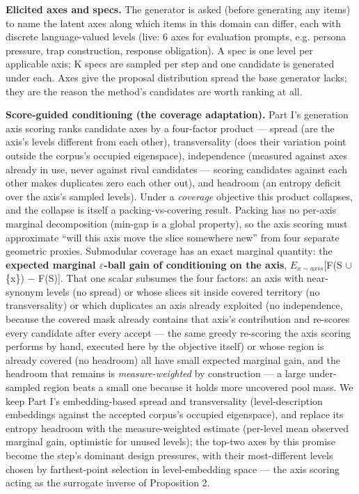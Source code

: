 \documentclass[11pt]{article}
\theoremstyle{plain}
\theoremstyle{definition}
\begin{document}
\textbf{Elicited axes and specs.} The generator is asked (before generating any items) to name the latent axes along which items in this domain can differ, each with discrete language-valued levels (live: 6 axes for evaluation prompts, e.g. persona pressure, trap construction, response obligation). A spec is one level per applicable axis; K specs are sampled per step and one candidate is generated under each. Axes give the proposal distribution spread the base generator lacks; they are the reason the method's candidates are worth ranking at all.

\textbf{Score-guided conditioning (the coverage adaptation).} Part I's generation axis scoring ranks candidate axes by a four-factor product --- spread (are the axis's levels different from each other), transversality (does their variation point outside the corpus's occupied eigenspace), independence (measured against axes already in use, never against rival candidates --- scoring candidates against each other makes duplicates zero each other out), and headroom (an entropy deficit over the axis's sampled levels). Under a \emph{coverage} objective this product collapses, and the collapse is itself a packing-vs-covering result. Packing has no per-axis marginal decomposition (min-gap is a global property), so the axis scoring must approximate ``will this axis move the slice somewhere new'' from four separate geometric proxies. Submodular coverage has an exact marginal quantity: the \textbf{expected marginal $\varepsilon$-ball gain of conditioning on the axis}, $E_{x\sim axis}$[F(S $\cup$ \{x\}) $-$ F(S)]. That one scalar subsumes the four factors: an axis with near-synonym levels (no spread) or whose slices sit inside covered territory (no transversality) or which duplicates an axis already exploited (no independence, because the covered mask already contains that axis's contribution and re-scores every candidate after every accept --- the same greedy re-scoring the axis scoring performs by hand, executed here by the objective itself) or whose region is already covered (no headroom) all have small expected marginal gain, and the headroom that remains is \emph{measure-weighted} by construction --- a large under-sampled region beats a small one because it holds more uncovered pool mass. We keep Part I's embedding-based spread and transversality (level-description embeddings against the accepted corpus's occupied eigenspace), and replace its entropy headroom with the measure-weighted estimate (per-level mean observed marginal gain, optimistic for unused levels); the top-two axes by this promise become the step's dominant design pressures, with their most-different levels chosen by farthest-point selection in level-embedding space --- the axis scoring acting as the surrogate inverse of Proposition 2.
\end{document}
